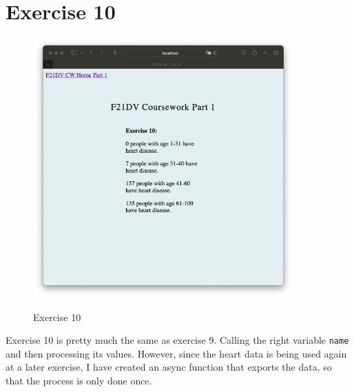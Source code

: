 \documentclass{scrreprt}
\begin{document}
\section{Exercise 10}
\begin{figure}[!ht]
    \centering
    \includegraphics[width = 10cm]{images/ex10.png}
    \label{fig:ex10}
    \caption{Exercise 10}
\end{figure}
\FloatBarrier

Exercise 10 is pretty much the same as exercise 9. Calling the right variable \verb|name| and then processing
its values. However, since the heart data is being used again at a later exercise, I have created an async
function that exports the data, so that the process is only done once. 

\newpage
\end{document}
